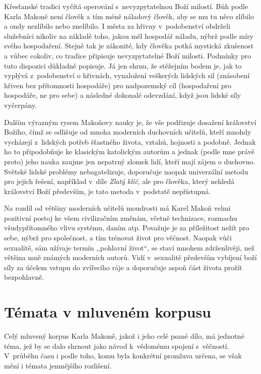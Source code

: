 Křesťanské tradici vyčítá operování s~nevyzpytatelnou Boží milostí. Bůh podle
Karla Makoně není člověk a tím méně náladový člověk, aby se mu tu něco zlíbilo a
ondy nezlíbilo nebo znelíbilo. I města za hřivny v~podobenství obdrželi služebníci nikoliv na
základě toho, jakou měl hospodář náladu, nýbrž podle míry svého hospodaření.
Stejně tak je zákonité, kdy člověka potká mystická zkušenost a vůbec cokoliv, co
tradice připisuje nevyzpytatelné Boží milosti. Podmínky pro tuto dispozici
důkladně popisuje. Já jen shrnu, že stěžejním bodem je, jak to vyplývá
z~podobenství o hřivnách, vynaložení veškerých lidských sil (znásobení hřiven
bez přítomnosti hospodáře) pro nadpozemský cíl (hospodaření pro hospodáře, ne
pro sebe) a následné dokonalé odevzdání, když jsou lidské síly vyčerpány.

Dalším výrazným rysem Makoňovy nauky je, že vše podřizuje dosažení království
Božího, čímž se odlišuje od mnoha moderních duchovních učitelů, kteří mnohdy
vycházejí z~lidských potřeb šťastného života, vztahů, hojnosti a podobně. Jednak
ho to připodobňuje ke klasickým katolickým autorům a jednak (podle mne právě
proto) jeho nauka zaujme jen nepatrný zlomek lidí, kteří mají zájem o duchovno.
Světské lidské problémy nebagatelizuje, doporučuje naopak univerzální metodu pro
jejich řešení, například v~díle {\em Zlatý klíč}, ale pro člověka,
který nehledá království Boží především, je tato metoda v~podstatě nepřístupná.

Na rozdíl od většiny moderních učitelů moudrosti má Karel Makoň velmi pozitivní
postoj ke všem civilizačním změnám, včetně technizace, rozmachu
všudypřítomného vlivu systému, daním atp. Považuje je za příležitost nežít pro
sebe, nýbrž pro společnost, a tím trénovat život pro věčnost. Naopak vůči
sexualitě, sám užívaje termín ,,pohlavní život``, se staví mnohem zdrženlivěji,
než většina mně známých moderních autorů. Vidí v~sexualitě především vybíjení
boží síly za účelem vstupu do zvířecího ráje a doporučuje aspoň část života
prožít bezpohlavně.

\section{Témata v mluveném korpusu}

Celý mluvený korpus Karla Makoně, jakož i jeho celé psané dílo, má jednotné
téma, jež by se dalo shrnout jako návod k~vědomému spojení s~věčností.
V~průběhu času i podle toho, komu byla konkrétní promluva určena, se však mění 
i témata jemnějšího rozlišení.


